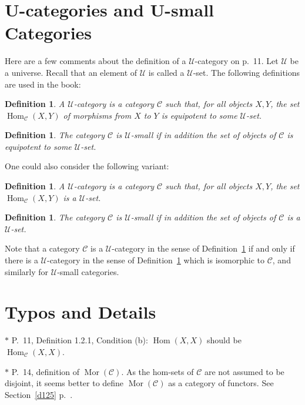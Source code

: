 \documentclass[12pt]{article}
\newtheorem{df}[thm]{Definition}%
\theoremstyle{remark}
\theoremstyle{definition}
\newcommand{\C}{\mathcal C}
\newcommand{\U}{\mathcal U}
\DeclareMathOperator{\Hom}{Hom}%
\DeclareMathOperator{\Mor}{Mor}
\begin{document}
\section{U-categories and U-small Categories}\label{ucat}
%
Here are a few comments about the definition of a $\U$-category on p.~11. Let $\U$ be a universe. Recall that an element of $\U$ is called a $\U$-set. The following definitions are used in the book: 
%
\begin{df}\label{ucatg}
A $\U$-{\em category} is a category $\C$ such that, for all objects $X,Y$, the set $\Hom_\C(X,Y)$ of morphisms from $X$ to $Y$ is equipotent to some $\U$-set. 
\end{df} 
%
\begin{df}
The category $\C$ is $\U$-{\em small} if in addition the set of objects of $\C$ is equipotent to some $\U$-set. 
\end{df} 
%
One could also consider the following variant: 
%
\begin{df}\label{ducat}
A $\U$-{\em category} is a category $\C$ such that, for all objects $X,Y$, the set $\Hom_\C(X,Y)$ is a $\U$-set. 
\end{df} 
%
\begin{df}\label{small}
The category $\C$ is $\U$-{\em small} if in addition the set of objects of $\C$ is a $\U$-set. 
\end{df} 
%
Note that a category $\C$ is a $\U$-category in the sense of Definition~\ref{ucatg} if and only if there is a $\U$-category in the sense of Definition~\ref{ducat} which is isomorphic to $\C$, and similarly for $\U$-small categories.%
%
\begin{center}
\end{center}
%
%
\section{Typos and Details}
%
$*$ P.~11, Definition 1.2.1, Condition (b): $\Hom(X,X)$ should be $\Hom_{\C}(X,X)$. 

\noindent $*$ P.~14, definition of $\Mor(\C)$. As the hom-sets of $\C$ are not assumed to be disjoint, it seems better to define $\Mor(\C)$ as a category of functors. See Section~\ref{d125} p.~\pageref{d125}.

\end{document}
